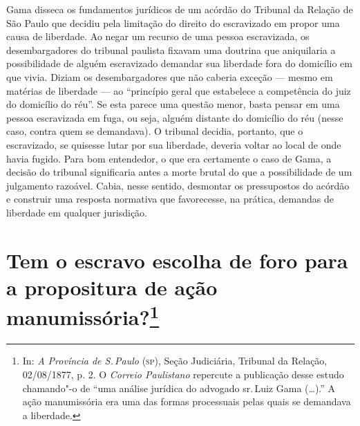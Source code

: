 \pagebreak
\mbox{}\vfill
\thispagestyle{empty}

{\small\noindent
Gama disseca os fundamentos
jurídicos de um acórdão do Tribunal da Relação de São Paulo que decidiu
pela limitação do direito do escravizado em propor uma causa de
liberdade. Ao negar um recurso de uma pessoa escravizada, os
desembargadores do tribunal paulista fixavam uma doutrina que
aniquilaria a possibilidade de alguém escravizado demandar sua liberdade
fora do domicílio em que vivia. Diziam os desembargadores que não
caberia exceção --- mesmo em matérias de liberdade --- ao ``princípio geral
que estabelece a competência do juiz do domicílio do réu''. Se esta
parece uma questão menor, basta pensar em uma pessoa escravizada em
fuga, ou seja, alguém distante do domicílio do réu (nesse caso, contra
quem se demandava). O tribunal decidia, portanto, que o escravizado, se
quisesse lutar por sua liberdade, deveria voltar ao local de onde havia
fugido. Para bom entendedor, o que era certamente o caso de Gama, a
decisão do tribunal significaria antes a morte brutal do que a
possibilidade de um julgamento razoável. Cabia, nesse sentido, desmontar
os pressupostos do acórdão e construir uma resposta normativa que
favorecesse, na prática, demandas de liberdade em qualquer jurisdição. }

\chapter{Tem o escravo escolha de foro para a propositura de ação
manumissória?\footnote[*]{In: \emph{A Província de S.\,Paulo} (\textsc{sp}), Seção
  Judiciária, Tribunal da Relação, 02/08/1877, p. 2. O \emph{Correio
  Paulistano} repercute a publicação desse estudo chamando"-o de ``uma
  análise jurídica do advogado sr.\,Luiz Gama (\ldots{}).'' A ação manumissória
  era uma das formas processuais pelas quais se demandava a liberdade.}}


